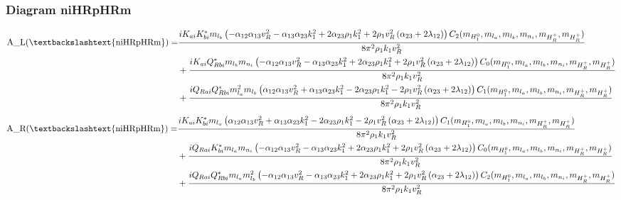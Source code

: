 \documentclass{article}
\begin{document}
\subsubsection{Diagram niHRpHRm}
\begin{align*}
\mathtt{\text{A\_L(\textbackslashtext\{niHRpHRm\})}} = & \frac{i K_{ai} K_{bi}^* m_{l_b} \left(- \alpha_{12} \alpha_{13} v_{R}^{2} - \alpha_{13} \alpha_{23} k_{1}^{2} + 2 \alpha_{23} \rho_{1} k_{1}^{2} + 2 \rho_{1} v_{R}^{2} \left(\alpha_{23} + 2 \lambda_{12}\right)\right) C_2(m_{H_1^0}, m_{l_a}, m_{l_b}, m_{n_i}, m_{H_R^+}, m_{H_R^+})}{8 \pi^{2} \rho_{1} k_{1} v_{R}^{2}} \\
& + \frac{i K_{ai} Q_{Rbi}^* m_{l_b} m_{n_i} \left(- \alpha_{12} \alpha_{13} v_{R}^{2} - \alpha_{13} \alpha_{23} k_{1}^{2} + 2 \alpha_{23} \rho_{1} k_{1}^{2} + 2 \rho_{1} v_{R}^{2} \left(\alpha_{23} + 2 \lambda_{12}\right)\right) C_0(m_{H_1^0}, m_{l_a}, m_{l_b}, m_{n_i}, m_{H_R^+}, m_{H_R^+})}{8 \pi^{2} \rho_{1} k_{1} v_{R}^{2}} \\
& + \frac{i Q_{Rai} Q_{Rbi}^* m_{l_a}^{2} m_{l_b} \left(\alpha_{12} \alpha_{13} v_{R}^{2} + \alpha_{13} \alpha_{23} k_{1}^{2} - 2 \alpha_{23} \rho_{1} k_{1}^{2} - 2 \rho_{1} v_{R}^{2} \left(\alpha_{23} + 2 \lambda_{12}\right)\right) C_1(m_{H_1^0}, m_{l_a}, m_{l_b}, m_{n_i}, m_{H_R^+}, m_{H_R^+})}{8 \pi^{2} \rho_{1} k_{1} v_{R}^{2}} 
\end{align*}
\begin{align*}
\mathtt{\text{A\_R(\textbackslashtext\{niHRpHRm\})}} = & \frac{i K_{ai} K_{bi}^* m_{l_a} \left(\alpha_{12} \alpha_{13} v_{R}^{2} + \alpha_{13} \alpha_{23} k_{1}^{2} - 2 \alpha_{23} \rho_{1} k_{1}^{2} - 2 \rho_{1} v_{R}^{2} \left(\alpha_{23} + 2 \lambda_{12}\right)\right) C_1(m_{H_1^0}, m_{l_a}, m_{l_b}, m_{n_i}, m_{H_R^+}, m_{H_R^+})}{8 \pi^{2} \rho_{1} k_{1} v_{R}^{2}} \\
& + \frac{i Q_{Rai} K_{bi}^* m_{l_a} m_{n_i} \left(- \alpha_{12} \alpha_{13} v_{R}^{2} - \alpha_{13} \alpha_{23} k_{1}^{2} + 2 \alpha_{23} \rho_{1} k_{1}^{2} + 2 \rho_{1} v_{R}^{2} \left(\alpha_{23} + 2 \lambda_{12}\right)\right) C_0(m_{H_1^0}, m_{l_a}, m_{l_b}, m_{n_i}, m_{H_R^+}, m_{H_R^+})}{8 \pi^{2} \rho_{1} k_{1} v_{R}^{2}} \\
& + \frac{i Q_{Rai} Q_{Rbi}^* m_{l_a} m_{l_b}^{2} \left(- \alpha_{12} \alpha_{13} v_{R}^{2} - \alpha_{13} \alpha_{23} k_{1}^{2} + 2 \alpha_{23} \rho_{1} k_{1}^{2} + 2 \rho_{1} v_{R}^{2} \left(\alpha_{23} + 2 \lambda_{12}\right)\right) C_2(m_{H_1^0}, m_{l_a}, m_{l_b}, m_{n_i}, m_{H_R^+}, m_{H_R^+})}{8 \pi^{2} \rho_{1} k_{1} v_{R}^{2}} 
\end{align*}
\end{document}
